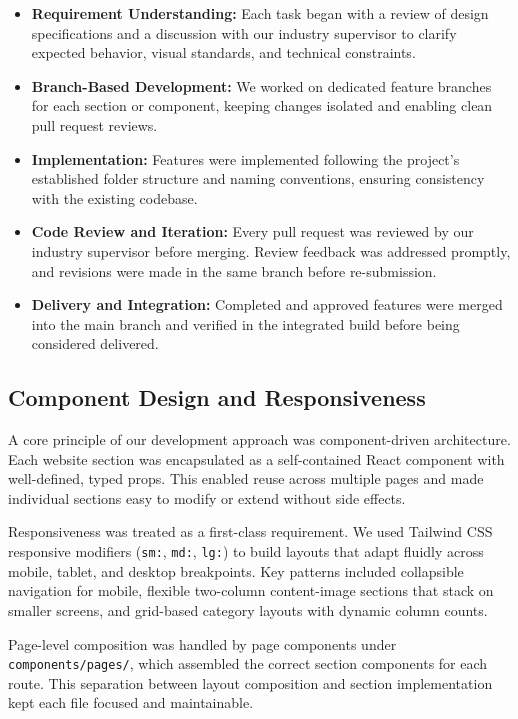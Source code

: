 \documentclass[12pt, oneside, a4paper]{book}
\begin{document}
\begin{doublespace}
\begin{itemize}
  \item \textbf{Requirement Understanding:} Each task began with a review of design
  specifications and a discussion with our industry supervisor to clarify expected
  behavior, visual standards, and technical constraints.
  \item \textbf{Branch-Based Development:} We worked on dedicated feature branches for
  each section or component, keeping changes isolated and enabling clean pull request
  reviews.
  \item \textbf{Implementation:} Features were implemented following the project's
  established folder structure and naming conventions, ensuring consistency with the
  existing codebase.
  \item \textbf{Code Review and Iteration:} Every pull request was reviewed by our
  industry supervisor before merging. Review feedback was addressed promptly, and
  revisions were made in the same branch before re-submission.
  \item \textbf{Delivery and Integration:} Completed and approved features were merged
  into the main branch and verified in the integrated build before being considered
  delivered.
\end{itemize}

\subsection{Component Design and Responsiveness}

A core principle of our development approach was component-driven architecture.
Each website section was encapsulated as a self-contained React component with
well-defined, typed props. This enabled reuse across multiple pages and made
individual sections easy to modify or extend without side effects.

Responsiveness was treated as a first-class requirement. We used Tailwind CSS
responsive modifiers (\texttt{sm:}, \texttt{md:}, \texttt{lg:}) to build layouts
that adapt fluidly across mobile, tablet, and desktop breakpoints. Key patterns
included collapsible navigation for mobile, flexible two-column content-image
sections that stack on smaller screens, and grid-based category layouts with
dynamic column counts.

Page-level composition was handled by page components under \texttt{components/pages/},
which assembled the correct section components for each route. This separation between
layout composition and section implementation kept each file focused and maintainable.


\end{doublespace}
\end{document}
